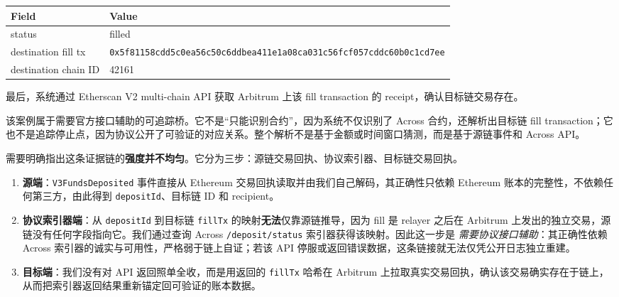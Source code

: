 \documentclass[12pt,a4paper]{ctexart}
\providecommand{\tightlist}{\setlength{\itemsep}{0pt}\setlength{\parskip}{0pt}}
\begin{document}
\begin{longtable}[]{@{}ll@{}}
\toprule
\begin{minipage}[b]{0.47\columnwidth}\raggedright
Field\strut
\end{minipage} & \begin{minipage}[b]{0.47\columnwidth}\raggedright
Value\strut
\end{minipage}\tabularnewline
\midrule
\endhead
\begin{minipage}[t]{0.47\columnwidth}\raggedright
status\strut
\end{minipage} & \begin{minipage}[t]{0.47\columnwidth}\raggedright
filled\strut
\end{minipage}\tabularnewline
\begin{minipage}[t]{0.47\columnwidth}\raggedright
destination fill tx\strut
\end{minipage} & \begin{minipage}[t]{0.47\columnwidth}\raggedright
\texttt{0x5f81158cdd5c0ea56c50c6ddbea411e1a08ca031c56fcf057cddc60b0c1cd7ee}\strut
\end{minipage}\tabularnewline
\begin{minipage}[t]{0.47\columnwidth}\raggedright
destination chain ID\strut
\end{minipage} & \begin{minipage}[t]{0.47\columnwidth}\raggedright
42161\strut
\end{minipage}\tabularnewline
\bottomrule
\end{longtable}

最后，系统通过 Etherscan V2 multi-chain API 获取 Arbitrum 上该 fill
transaction 的 receipt，确认目标链交易存在。

该案例属于需要官方接口辅助的可追踪桥。它不是“只能识别合约”，因为系统不仅识别了 Across 合约，还解析出目标链 fill
transaction；它也不是追踪停止点，因为协议公开了可验证的对应关系。整个解析不是基于金额或时间窗口猜测，而是基于源链事件和 Across API。

需要明确指出这条证据链的\textbf{强度并不均匀}。它分为三步：源链交易回执、协议索引器、目标链交易回执。

\begin{enumerate}
\def\labelenumi{\arabic{enumi}.}
\tightlist
\item
  \textbf{源端}：\texttt{V3FundsDeposited} 事件直接从 Ethereum
  交易回执读取并由我们自己解码，其正确性只依赖 Ethereum
  账本的完整性，不依赖任何第三方，由此得到 \texttt{depositId}、目标链 ID
  和 recipient。
\item
  \textbf{协议索引器端}：从 \texttt{depositId} 到目标链 \texttt{fillTx}
  的映射\textbf{无法}仅靠源链推导，因为 fill 是 relayer 之后在 Arbitrum
  上发出的独立交易，源链没有任何字段指向它。我们通过查询 Across
  \texttt{/deposit/status} 索引器获得该映射。因此这一步是
  \emph{需要协议接口辅助}：其正确性依赖 Across
  索引器的诚实与可用性，严格弱于链上自证；若该 API
  停服或返回错误数据，这条链接就无法仅凭公开日志独立重建。
\item
  \textbf{目标端}：我们没有对 API 返回照单全收，而是用返回的
  \texttt{fillTx} 哈希在 Arbitrum
  上拉取真实交易回执，确认该交易确实存在于链上，从而把索引器返回结果重新锚定回可验证的账本数据。
\end{enumerate}
\end{document}
